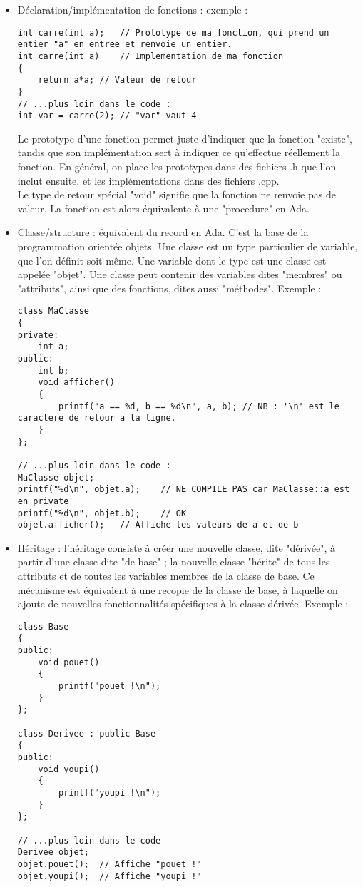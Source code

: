 \begin{itemize}
\item Déclaration/implémentation de fonctions : exemple :\\
\begin{lstlisting}
int carre(int a);	// Prototype de ma fonction, qui prend un entier "a" en entree et renvoie un entier.
int carre(int a)	// Implementation de ma fonction
{
	return a*a;	// Valeur de retour
}
// ...plus loin dans le code :
int var = carre(2);	// "var" vaut 4
\end{lstlisting}
Le prototype d'une fonction permet juste d'indiquer que la fonction "existe", tandis que son implémentation sert à indiquer ce qu'effectue réellement la fonction. En général, on place les prototypes dans des fichiers .h que l'on inclut ensuite, et les implémentations dans des fichiers .cpp.\\
Le type de retour spécial "void" signifie que la fonction ne renvoie pas de valeur. La fonction est alors équivalente à une "procedure" en Ada.

\item Classe/structure : équivalent du record en Ada. C'est la base de la programmation orientée objets. Une classe est un type particulier de variable, que l'on définit soit-même. Une variable dont le type est une classe est appelée "objet". Une classe peut contenir des variables dites "membres" ou "attributs", ainsi que des fonctions, dites aussi "méthodes". Exemple :\\
\begin{lstlisting}
class MaClasse
{
private:
	int a;
public:
	int b;
	void afficher()
	{
		printf("a == %d, b == %d\n", a, b);	// NB : '\n' est le caractere de retour a la ligne.
	}
};

// ...plus loin dans le code :
MaClasse objet;
printf("%d\n", objet.a);	// NE COMPILE PAS car MaClasse::a est en private
printf("%d\n", objet.b);	// OK
objet.afficher();	// Affiche les valeurs de a et de b
\end{lstlisting}

\item Héritage : l'héritage consiste à créer une nouvelle classe, dite "dérivée", à partir d'une classe dite "de base" ; la nouvelle classe "hérite" de tous les attributs et de toutes les variables membres de la classe de base. Ce mécanisme est équivalent à une recopie de la classe de base, à laquelle on ajoute de nouvelles fonctionnalités spécifiques à la classe dérivée. Exemple :\\
\begin{lstlisting}
class Base
{
public:
	void pouet()
	{
		printf("pouet !\n");
	}
};

class Derivee : public Base
{
public:
	void youpi()
	{
		printf("youpi !\n");
	}
};

// ...plus loin dans le code
Derivee objet;
objet.pouet();	// Affiche "pouet !"
objet.youpi();	// Affiche "youpi !"
\end{lstlisting}

\end{itemize}
